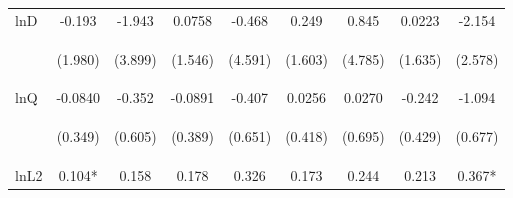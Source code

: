 \documentclass[]{article}
\begin{document}
\begin{center}
\begin{tabular}{lcccccccc}
lnD & -0.193 & -1.943 & 0.0758 & -0.468 & 0.249 & 0.845 & 0.0223 & -2.154 \\
\vspace{4pt} & \begin{footnotesize}(1.980)\end{footnotesize} & \begin{footnotesize}(3.899)\end{footnotesize} & \begin{footnotesize}(1.546)\end{footnotesize} & \begin{footnotesize}(4.591)\end{footnotesize} & \begin{footnotesize}(1.603)\end{footnotesize} & \begin{footnotesize}(4.785)\end{footnotesize} & \begin{footnotesize}(1.635)\end{footnotesize} & \begin{footnotesize}(2.578)\end{footnotesize} \\
lnQ & -0.0840 & -0.352 & -0.0891 & -0.407 & 0.0256 & 0.0270 & -0.242 & -1.094 \\
\vspace{4pt} & \begin{footnotesize}(0.349)\end{footnotesize} & \begin{footnotesize}(0.605)\end{footnotesize} & \begin{footnotesize}(0.389)\end{footnotesize} & \begin{footnotesize}(0.651)\end{footnotesize} & \begin{footnotesize}(0.418)\end{footnotesize} & \begin{footnotesize}(0.695)\end{footnotesize} & \begin{footnotesize}(0.429)\end{footnotesize} & \begin{footnotesize}(0.677)\end{footnotesize} \\
lnL2 & 0.104* & 0.158 & 0.178 & 0.326 & 0.173 & 0.244 & 0.213 & 0.367* \\

\end{tabular}
\end{center}
\end{document}
